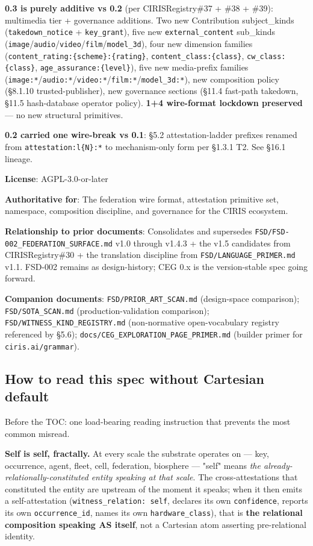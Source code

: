 \documentclass[10pt]{article}
\begin{document}
\textbf{0.3 is purely additive vs 0.2} (per CIRISRegistry\#37 + \#38 + \#39): multimedia tier + governance additions. Two new Contribution subject\_kinds (\texttt{takedown\_notice} + \texttt{key\_grant}), five new \texttt{external\_content} sub\_kinds (\texttt{image}/\texttt{audio}/\texttt{video}/\texttt{film}/\texttt{model\_3d}), four new dimension families (\texttt{content\_rating:\{scheme\}:\{rating\}}, \texttt{content\_class:\{class\}}, \texttt{cw\_class:\{class\}}, \texttt{age\_assurance:\{level\}}), five new media-prefix families (\texttt{image:*}/\texttt{audio:*}/\texttt{video:*}/\texttt{film:*}/\texttt{model\_3d:*}), new composition policy (§8.1.10 trusted-publisher), new governance sections (§11.4 fast-path takedown, §11.5 hash-database operator policy). \textbf{1+4 wire-format lockdown preserved} — no new structural primitives.


\textbf{0.2 carried one wire-break vs 0.1}: §5.2 attestation-ladder prefixes renamed from \texttt{attestation:l\{N\}:*} to mechanism-only form per §1.3.1 T2. See §16.1 lineage.

\textbf{License}: AGPL-3.0-or-later

\textbf{Authoritative for}: The federation wire format, attestation primitive set, namespace, composition discipline, and governance for the CIRIS ecosystem.

\textbf{Relationship to prior documents}: Consolidates and supersedes \texttt{FSD/FSD-002\_FEDERATION\_SURFACE.md} v1.0 through v1.4.3 + the v1.5 candidates from CIRISRegistry\#30 + the translation discipline from \texttt{FSD/LANGUAGE\_PRIMER.md} v1.1. FSD-002 remains as design-history; CEG 0.x is the version-stable spec going forward.

\textbf{Companion documents}: \texttt{FSD/PRIOR\_ART\_SCAN.md} (design-space comparison); \texttt{FSD/SOTA\_SCAN.md} (production-validation comparison); \texttt{FSD/WITNESS\_KIND\_REGISTRY.md} (non-normative open-vocabulary registry referenced by §5.6); \texttt{docs/CEG\_EXPLORATION\_PAGE\_PRIMER.md} (builder primer for \texttt{ciris.ai/grammar}).



\subsection*{How to read this spec without Cartesian default}


Before the TOC: one load-bearing reading instruction that prevents the most common misread.


\textbf{Self is self, fractally.} At every scale the substrate operates on — key, occurrence, agent, fleet, cell, federation, biosphere — "self" means \textit{the already-relationally-constituted entity speaking at that scale}. The cross-attestations that constituted the entity are upstream of the moment it speaks; when it then emits a self-attestation (\texttt{witness\_relation: self}, declares its own \texttt{confidence}, reports its own \texttt{occurrence\_id}, names its own \texttt{hardware\_class}), that is \textbf{the relational composition speaking AS itself}, not a Cartesian atom asserting pre-relational identity.
\end{document}
